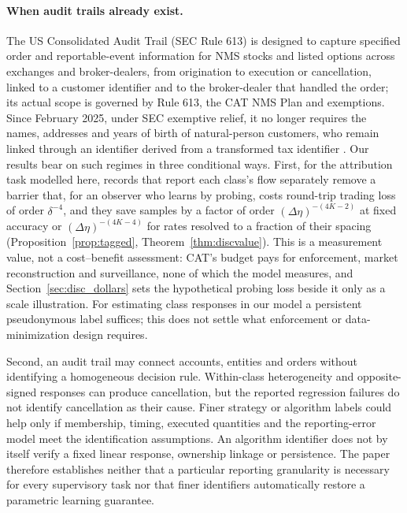\documentclass[12pt]{article}
\theoremstyle{definition}
\theoremstyle{remark}
\begin{document}
\paragraph{When audit trails already exist.} The US Consolidated Audit Trail (SEC Rule 613) is designed to capture specified order and reportable-event information for NMS stocks and listed options across exchanges and broker-dealers, from origination to execution or cancellation, linked to a customer identifier and to the broker-dealer that handled the order; its actual scope is governed by Rule 613, the CAT NMS Plan and exemptions. Since February 2025, under SEC exemptive relief, it no longer requires the names, addresses and years of birth of natural-person customers, who remain linked through an identifier derived from a transformed tax identifier \citep{sec2012,sec2016,sec2024cat,sec2025}. Our results bear on such regimes in three conditional ways. First, for the attribution task modelled here, records that report each class's flow separately remove a barrier that, for an observer who learns by probing, costs round-trip trading loss of order $\delta^{-4}$, and they save samples by a factor of order $(\Delta\eta)^{-(4K-2)}$ at fixed accuracy or $(\Delta\eta)^{-(4K-4)}$ for rates resolved to a fraction of their spacing (Proposition~\ref{prop:tagged}, Theorem~\ref{thm:discvalue}). This is a measurement value, not a cost--benefit assessment: CAT's budget pays for enforcement, market reconstruction and surveillance, none of which the model measures, and Section~\ref{sec:disc_dollars} sets the hypothetical probing loss beside it only as a scale illustration. For estimating class responses in our model a persistent pseudonymous label suffices; this does not settle what enforcement or data-minimization design requires. 

Second, an audit trail may connect accounts, entities and orders without identifying a homogeneous decision rule. Within-class heterogeneity and opposite-signed responses can produce cancellation, but the reported regression failures do not identify cancellation as their cause. Finer strategy or algorithm labels could help only if membership, timing, executed quantities and the reporting-error model meet the identification assumptions. An algorithm identifier does not by itself verify a fixed linear response, ownership linkage or persistence. The paper therefore establishes neither that a particular reporting granularity is necessary for every supervisory task nor that finer identifiers automatically restore a parametric learning guarantee.
\end{document}
